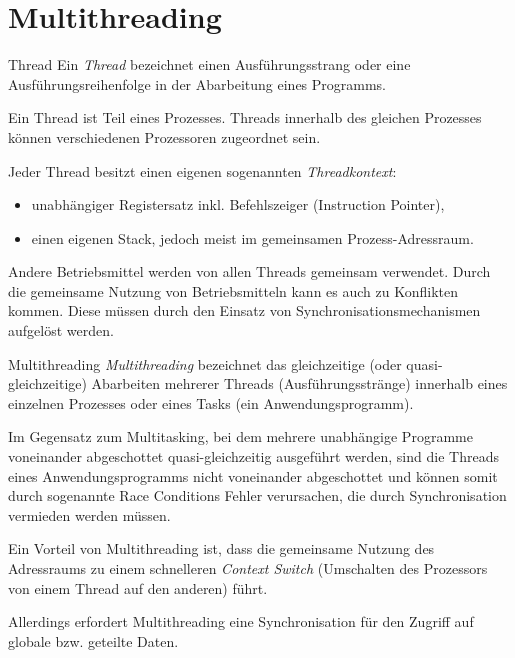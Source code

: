 \section{Multithreading}

\begin{defi}{Thread}
    Ein \emph{Thread} bezeichnet einen Ausführungsstrang oder eine Ausführungsreihenfolge in der Abarbeitung eines Programms.

    Ein Thread ist Teil eines Prozesses.
    Threads innerhalb des gleichen Prozesses können verschiedenen Prozessoren zugeordnet sein.

    Jeder Thread besitzt einen eigenen sogenannten \emph{Threadkontext}:
    \begin{itemize}
        \item unabhängiger Registersatz inkl. Befehlszeiger (Instruction Pointer),
        \item einen eigenen Stack, jedoch meist im gemeinsamen Prozess-Adressraum.
    \end{itemize}

    Andere Betriebsmittel werden von allen Threads gemeinsam verwendet.
    Durch die gemeinsame Nutzung von Betriebsmitteln kann es auch zu Konflikten kommen.
    Diese müssen durch den Einsatz von Synchronisationsmechanismen aufgelöst werden.
\end{defi}

\begin{defi}{Multithreading}
    \emph{Multithreading} bezeichnet das gleichzeitige (oder quasi-gleichzeitige) Abarbeiten mehrerer Threads (Ausführungsstränge) innerhalb eines einzelnen Prozesses oder eines Tasks (ein Anwendungsprogramm).

    Im Gegensatz zum Multitasking, bei dem mehrere unabhängige Programme voneinander abgeschottet quasi-gleichzeitig ausgeführt werden, sind die Threads eines Anwendungsprogramms nicht voneinander abgeschottet und können somit durch sogenannte Race Conditions Fehler verursachen, die durch Synchronisation vermieden werden müssen.

    Ein Vorteil von Multithreading ist, dass die gemeinsame Nutzung des Adressraums zu einem schnelleren \emph{Context Switch} (Umschalten des Prozessors von einem Thread auf den anderen) führt.

    Allerdings erfordert Multithreading eine Synchronisation für den Zugriff auf globale bzw. geteilte Daten.
\end{defi}

